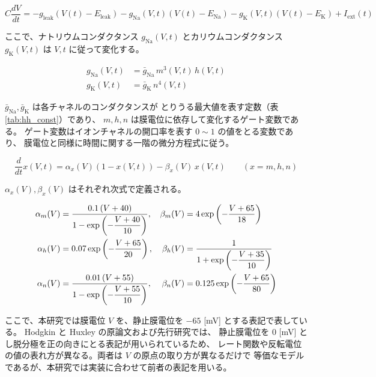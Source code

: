 \documentclass[a4paper,11pt,openany]{ltjsreport}
\newcommand{\Iext}{I_{\mathrm{ext}}}
\newcommand{\gleak}{g_{\mathrm{leak}}}
\newcommand{\gNa}{g_{\mathrm{Na}}}
\newcommand{\gK}{g_{\mathrm{K}}}
\newcommand{\ENa}{E_{\mathrm{Na}}}
\newcommand{\EK}{E_{\mathrm{K}}}
\newcommand{\Eleak}{E_{\mathrm{leak}}}
\begin{document}
\begin{equation}
  C\frac{dV}{dt} = -\gleak\left(V(t)-\Eleak\right)
                   -\gNa(V,t)\left(V(t)-\ENa\right)
                   -\gK(V,t)\left(V(t)-\EK\right) + \Iext(t)
  \label{eq:hh_v}
\end{equation}

ここで、ナトリウムコンダクタンス $\gNa(V,t)$ とカリウムコンダクタンス $\gK(V,t)$ は
$V, t$ に従って変化する。

\begin{align}
  \gNa(V,t) &= \bar{g}_{\mathrm{Na}}\, m^3(V,t)\, h(V,t) \label{eq:gna}\\
  \gK(V,t)  &= \bar{g}_{\mathrm{K}}\, n^4(V,t)           \label{eq:gk}
\end{align}

$\bar{g}_{\mathrm{Na}}, \bar{g}_{\mathrm{K}}$ は各チャネルのコンダクタンスが
とりうる最大値を表す定数（表\ref{tab:hh_const}）であり、
$m, h, n$ は膜電位に依存して変化するゲート変数である。
ゲート変数はイオンチャネルの開口率を表す $0 \sim 1$ の値をとる変数であり、
膜電位と同様に時間に関する一階の微分方程式に従う。

\begin{equation}
  \frac{d}{dt}x(V,t) = \alpha_x(V)\left(1 - x(V,t)\right) - \beta_x(V)\, x(V,t)
  \qquad (x = m, h, n)
  \label{eq:hh_gate}
\end{equation}

$\alpha_x(V), \beta_x(V)$ はそれぞれ次式で定義される。

\begin{align}
  \alpha_m(V) &= \frac{0.1\,(V + 40)}{1 - \exp\left(-\dfrac{V + 40}{10}\right)}, &
  \beta_m(V)  &= 4\exp\left(-\frac{V + 65}{18}\right) \notag\\
  \alpha_h(V) &= 0.07\exp\left(-\frac{V + 65}{20}\right), &
  \beta_h(V)  &= \frac{1}{1 + \exp\left(-\dfrac{V + 35}{10}\right)} \label{eq:rate}\\
  \alpha_n(V) &= \frac{0.01\,(V + 55)}{1 - \exp\left(-\dfrac{V + 55}{10}\right)}, &
  \beta_n(V)  &= 0.125\exp\left(-\frac{V + 65}{80}\right) \notag
\end{align}

ここで、本研究では膜電位 $V$ を、静止膜電位を $-65$ [\si{mV}] とする表記で表している。
Hodgkin と Huxley の原論文\cite{hodgkin1952}および先行研究\cite{munechika2025}では、
静止膜電位を $0$ [\si{mV}] とし脱分極を正の向きにとる表記が用いられているため、
レート関数や反転電位の値の表れ方が異なる。両者は $V$ の原点の取り方が異なるだけで
等価なモデルであるが、本研究では実装に合わせて前者の表記を用いる。
\end{document}
